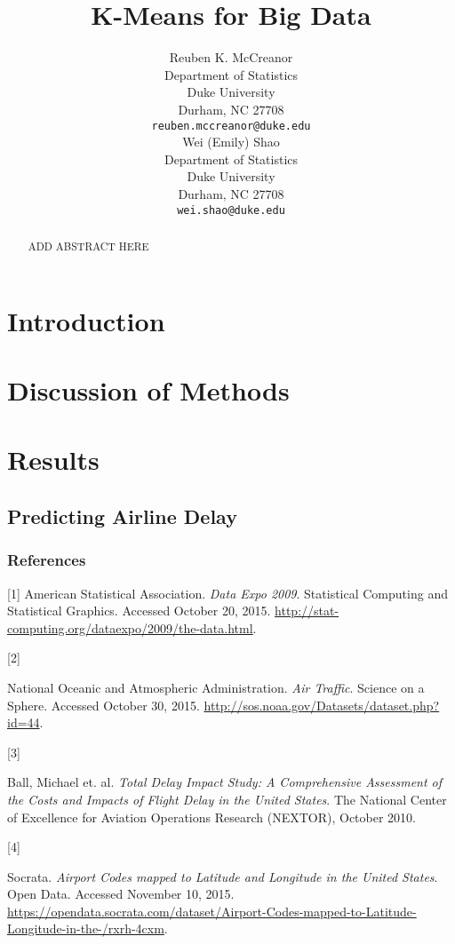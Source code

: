 \documentclass{article} %
\title{K-Means for Big Data}
\author{
Reuben K. McCreanor \\
Department of Statistics\\
Duke University\\
Durham, NC 27708 \\
\texttt{reuben.mccreanor@duke.edu} \\
\And
Wei (Emily) Shao\\
Department of Statistics\\
Duke University\\
Durham, NC 27708 \\
\texttt{wei.shao@duke.edu} \\
}
\begin{document}
\maketitle

\begin{abstract}
ADD ABSTRACT HERE
\end{abstract}

\section{Introduction}
\label{headings}


\section{Discussion of Methods}
\label{headings}


\section{Results}
\label{headings}

\subsection{Predicting Airline Delay}


\clearpage
\newpage


\subsubsection*{References}


\hypertarget{Ref1}{[1] American Statistical Association. \textit{Data Expo 2009}. Statistical Computing and Statistical Graphics. Accessed October 20, 2015. \url{http://stat-computing.org/dataexpo/2009/the-data.html}.}

\hypertarget{Ref2}{[2]} National Oceanic and Atmospheric Administration. \textit{Air Traffic}. Science on a Sphere. Accessed October 30, 2015. \url{http://sos.noaa.gov/Datasets/dataset.php?id=44}.

\hypertarget{Ref3}{[3]} Ball, Michael et. al. \textit{Total Delay Impact Study: A Comprehensive Assessment of the Costs and Impacts of Flight Delay in the United States}. The National Center of Excellence for Aviation Operations Research (NEXTOR), October 2010.

\hypertarget{Ref4}{[4]} Socrata. \textit{Airport Codes mapped to Latitude and Longitude in the United States}. Open Data. Accessed November 10, 2015. \url{https://opendata.socrata.com/dataset/Airport-Codes-mapped-to-Latitude-Longitude-in-the-/rxrh-4cxm}.
\end{document}
